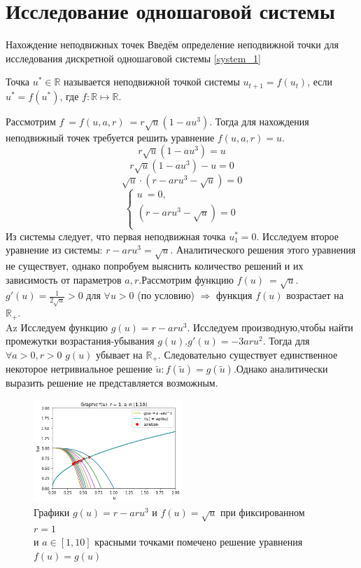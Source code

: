 \documentclass[11pt]{article}
\begin{document}
\section{Исследование одношаговой системы}
	\begin{subsection}{Нахождение неподвижных точек}
	Введём определение неподвижной точки для исследования дискретной одношаговой системы \ref{system_1}
	\begin{definition} Точка $u^* \in \mathbb{R} $ называется неподвижной точкой
	системы $ u_{t+1} = f(u_t)$, если $u^* = f(u^*)$, где $f : \mathbb{R} \mapsto \mathbb{R}$.
	\end{definition}
	Рассмотрим $f~= f(u,a,r)~= r\sqrt{u} (1 - a u^3)$. Тогда для нахождения неподвижный точек требуется решить уравнение $f(u,a,r) = u$.
	$$ r\sqrt{u} (1 - a u^3) = u $$
	$$ r\sqrt{u}(1 - a u^3) - u = 0 $$ 
	$$ \sqrt{u} \cdot (r - aru^3 - \sqrt{u}) = 0 $$
	\begin{equation*}	
	\begin{cases}
	u~= 0,
	\\
	(r - aru^3 - \sqrt{u}) = 0
	\\
	\end{cases}
	\end{equation*}
	Из системы следует, что первая неподвижная точка $ u^*_1 = 0$. Исследуем второе уравнение из системы: $r - aru^3 = \sqrt{u} $. Аналитического решения этого уравнения не существует, однако попробуем выяснить количество решений и их зависимость от параметров $a,r$.Рассмотрим функцию $f(u)~= \sqrt{u}$. $g'(u) = \frac{1}{2\sqrt{u}} > 0 $ для $\forall u > 0$ (по условию) $\Rightarrow $ функция $f(u)$ возрастает на $\mathbb{R}_+$. \\
Az	Исследуем функцию $g(u) = r - aru^3 $. Исследуем производную,чтобы найти промежутки возрастания-убывания $g(u)$.$g'(u) = -3aru^2$. Тогда для $\forall a > 0, r > 0$ $g(u)$ убывает на $\mathbb{R}_+$. Следовательно существует единственное некоторое нетривиальное решение $\tilde{u}: f(\tilde{u}) = g(\tilde{u})$.Однако аналитически выразить решение не представляется возможным.
\begin{figure}[H]
\begin{center}
\includegraphics[width=0.5\textwidth]{graphic_2.png}
\caption{Графики $g(u) = r - aru^3$ и $f(u) = \sqrt{u}$ при фиксированном $r=1$ 
\\ и $a \in [1,10]$ красными точками помечено решение уравнения $f(u) = g(u)$} \label{pic_1}
\end{center}
\end{figure}

	\end{subsection}
\end{document}
